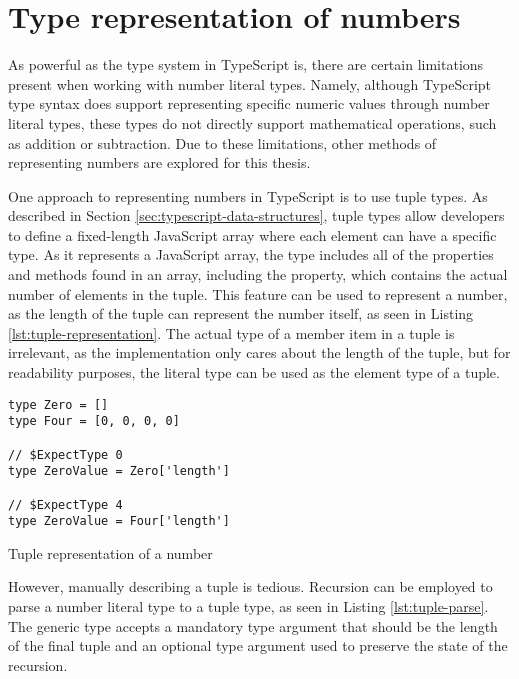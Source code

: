 \section{Type representation of numbers}

As powerful as the type system in TypeScript is, there are certain limitations present when working with number literal types. Namely, although TypeScript type syntax does support representing specific numeric values through number literal types, these types do not directly support mathematical operations, such as addition or subtraction. Due to these limitations, other methods of representing numbers are explored for this thesis.

One approach to representing numbers in TypeScript is to use tuple types. As described in Section \ref{sec:typescript-data-structures}, tuple types allow developers to define a fixed-length JavaScript array where each element can have a specific type. As it represents a JavaScript array, the type includes all of the properties and methods found in an array, including the  property, which contains the actual number of elements in the tuple. This feature can be used to represent a number, as the length of the tuple can represent the number itself, as seen in Listing \ref{lst:tuple-representation}. The actual type of a member item in a tuple is irrelevant, as the implementation only cares about the length of the tuple, but for readability purposes, the literal type  can be used as the element type of a tuple.

\begin{listing}[ht]
  \begin{verbatim}
type Zero = []
type Four = [0, 0, 0, 0] 

// $ExpectType 0
type ZeroValue = Zero['length']

// $ExpectType 4
type ZeroValue = Four['length']
\end{verbatim}
  \caption{Tuple representation of a number}\label{lst:tuple-representation}
\end{listing}

However, manually describing a tuple is tedious. Recursion can be employed to parse a number literal type to a tuple type, as seen in Listing \ref{lst:tuple-parse}. The  generic type accepts a mandatory type argument  that should be the length of the final tuple and an optional type argument  used to preserve the state of the recursion.

